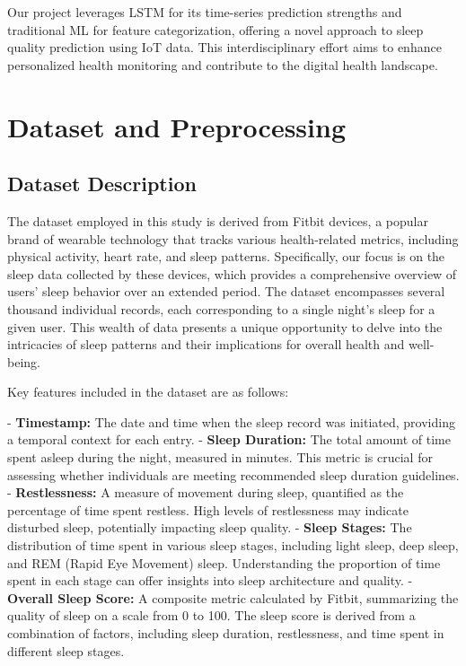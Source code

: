 \documentclass[10pt]{extarticle}
\begin{document}
Our project leverages LSTM for its time-series prediction strengths and traditional ML for feature categorization, offering a novel approach to sleep quality prediction using IoT data. This interdisciplinary effort aims to enhance personalized health monitoring and contribute to the digital health landscape.

\section{Dataset and Preprocessing}

\subsection{Dataset Description}

The dataset employed in this study is derived from Fitbit devices, a popular brand of wearable technology that tracks various health-related metrics, including physical activity, heart rate, and sleep patterns. Specifically, our focus is on the sleep data collected by these devices, which provides a comprehensive overview of users' sleep behavior over an extended period. The dataset encompasses several thousand individual records, each corresponding to a single night's sleep for a given user. This wealth of data presents a unique opportunity to delve into the intricacies of sleep patterns and their implications for overall health and well-being.

Key features included in the dataset are as follows:

- \textbf{Timestamp:} The date and time when the sleep record was initiated, providing a temporal context for each entry.
- \textbf{Sleep Duration:} The total amount of time spent asleep during the night, measured in minutes. This metric is crucial for assessing whether individuals are meeting recommended sleep duration guidelines.
- \textbf{Restlessness:} A measure of movement during sleep, quantified as the percentage of time spent restless. High levels of restlessness may indicate disturbed sleep, potentially impacting sleep quality.
- \textbf{Sleep Stages:} The distribution of time spent in various sleep stages, including light sleep, deep sleep, and REM (Rapid Eye Movement) sleep. Understanding the proportion of time spent in each stage can offer insights into sleep architecture and quality.
- \textbf{Overall Sleep Score:} A composite metric calculated by Fitbit, summarizing the quality of sleep on a scale from 0 to 100. The sleep score is derived from a combination of factors, including sleep duration, restlessness, and time spent in different sleep stages.
\end{document}
